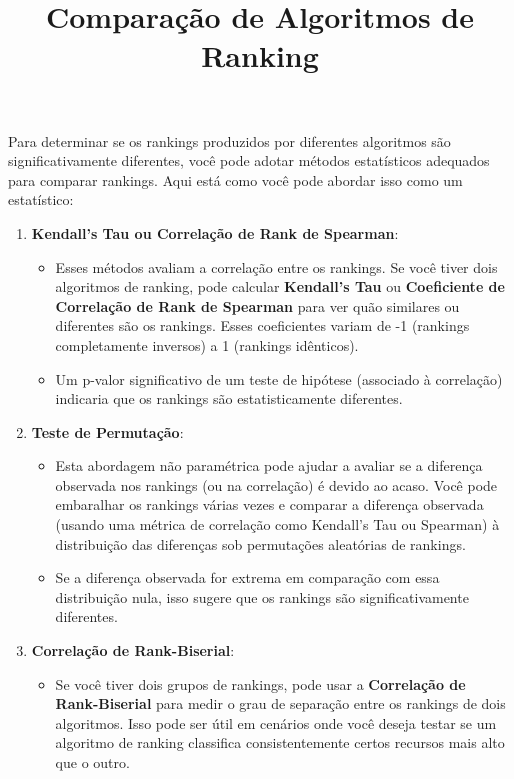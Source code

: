 \documentclass{article}
\title{Comparação de Algoritmos de Ranking}
\author{}
\date{}
\begin{document}
\maketitle

Para determinar se os rankings produzidos por diferentes algoritmos são significativamente diferentes, você pode adotar métodos estatísticos adequados para comparar rankings. Aqui está como você pode abordar isso como um estatístico:

\begin{enumerate}
    \item \textbf{Kendall’s Tau ou Correlação de Rank de Spearman}:  
    \begin{itemize}
        \item Esses métodos avaliam a correlação entre os rankings. Se você tiver dois algoritmos de ranking, pode calcular \textbf{Kendall's Tau} ou \textbf{Coeficiente de Correlação de Rank de Spearman} para ver quão similares ou diferentes são os rankings. Esses coeficientes variam de -1 (rankings completamente inversos) a 1 (rankings idênticos).
        \item Um p-valor significativo de um teste de hipótese (associado à correlação) indicaria que os rankings são estatisticamente diferentes.
    \end{itemize}

    \item \textbf{Teste de Permutação}:  
    \begin{itemize}
        \item Esta abordagem não paramétrica pode ajudar a avaliar se a diferença observada nos rankings (ou na correlação) é devido ao acaso. Você pode embaralhar os rankings várias vezes e comparar a diferença observada (usando uma métrica de correlação como Kendall’s Tau ou Spearman) à distribuição das diferenças sob permutações aleatórias de rankings.
        \item Se a diferença observada for extrema em comparação com essa distribuição nula, isso sugere que os rankings são significativamente diferentes.
    \end{itemize}

    \item \textbf{Correlação de Rank-Biserial}:  
    \begin{itemize}
        \item Se você tiver dois grupos de rankings, pode usar a \textbf{Correlação de Rank-Biserial} para medir o grau de separação entre os rankings de dois algoritmos. Isso pode ser útil em cenários onde você deseja testar se um algoritmo de ranking classifica consistentemente certos recursos mais alto que o outro.
    \end{itemize}


\end{enumerate}
\end{document}

